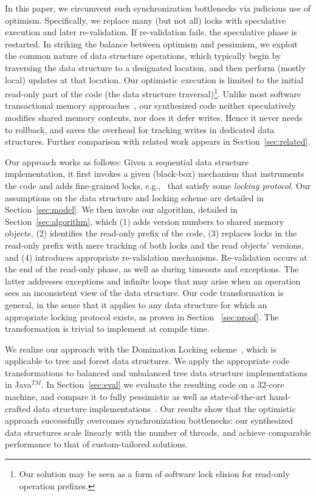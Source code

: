 In this paper, we circumvent such synchronization bottlenecks via judicious use of optimism.
Specifically, we replace many (but not all) locks with speculative execution and later re-validation.
If re-validation fails, the speculative phase is restarted.
In striking the balance between optimism and pessimism, we exploit the common nature of data structure operations,
which typically begin by traversing the data structure to a designated location, and then perform (mostly local) updates at that location.
Our optimistic execution is limited to the initial read-only part of the code (the data structure traversal)\footnote{Our solution may be seen as a form of software lock elision for read-only operation prefixes.}.
Unlike most software transactional memory approaches~\cite{HLR:SLCA2010},
our synthesized code neither speculatively modifies shared memory contents, nor does it defer writes.
Hence it never needs to rollback, and saves the overhead for tracking writes in dedicated data structures.
Further comparison with related work appears in Section~\ref{sec:related}.

Our approach works as follows: Given a sequential data structure implementation,
it first invokes a given (black-box) mechanism that instruments the code and adds
fine-grained locks, e.g.,~\cite{Gueta2011,MZGB:POPL06} that satisfy some
\emph{locking protocol}. Our assumptions on the data structure and locking scheme
are detailed in Section~\ref{sec:model}.
We then invoke our algorithm, detailed in Section~\ref{sec:algorithm}, which
(1) adds version numbers to shared memory objects,
(2) identifies the read-only prefix of the code,
(3) replaces locks in the read-only prefix with mere tracking of both locks and the read objects' versions, and
(4) introduces appropriate re-validation mechanisms.
Re-validation occurs at the end of the read-only phase, as well as during timeouts and exceptions.
The latter addresses exceptions and infinite loops that may arise when an operation sees an inconsistent view of the data structure.
Our code transformation is general, in the sense that it applies to any data structure for which an appropriate locking protocol exists,
as proven in Section ~\ref{sec:proof}. The transformation is trivial to implement at compile time.

We realize our approach with the Domination Locking scheme~\cite{Gueta2011},
which is applicable to tree and forest data structures.
We apply the appropriate code transformations to balanced and unbalanced tree data structure implementations in Java$^{TM}$.
In Section~\ref{sec:eval} we evaluate the resulting code on a $32$-core machine,
and compare it to fully pessimistic as well as state-of-the-art hand-crafted
data structure implementations~\cite{DrachslerVY2014,BronsonCCO2010}.
Our results show that the optimistic approach successfully overcomes synchronization bottlenecks:
our synthesized data structures scale linearly  with the number of threads,
and achieve comparable performance to that of custom-tailored solutions.

